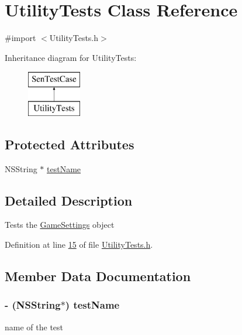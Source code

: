 \hypertarget{interface_utility_tests}{\section{Utility\-Tests Class Reference}
\label{dc/d82/interface_utility_tests}
}


{\ttfamily \#import $<$Utility\-Tests.\-h$>$}

Inheritance diagram for Utility\-Tests\-:\begin{figure}[H]
\begin{center}
\leavevmode
\includegraphics[height=2.000000cm]{dc/d82/interface_utility_tests}
\end{center}
\end{figure}
\subsection*{Protected Attributes}
\begin{DoxyCompactItemize}
\item 
N\-S\-String $\ast$ \hyperlink{interface_utility_tests_a0d3c1bf9a3bb4676bcf18650af0168d8}{test\-Name}
\end{DoxyCompactItemize}


\subsection{Detailed Description}
Tests the \hyperlink{interface_game_settings}{Game\-Settings} object 

Definition at line \hyperlink{_utility_tests_8h_source_l00015}{15} of file \hyperlink{_utility_tests_8h_source}{Utility\-Tests.\-h}.



\subsection{Member Data Documentation}
\hypertarget{interface_utility_tests_a0d3c1bf9a3bb4676bcf18650af0168d8}{
\subsubsection[{test\-Name}]{\setlength{\rightskip}{0pt plus 5cm}-\/ (N\-S\-String$\ast$) test\-Name\hspace{0.3cm}{\ttfamily [protected]}}}\label{dc/d82/interface_utility_tests_a0d3c1bf9a3bb4676bcf18650af0168d8}
name of the test 

